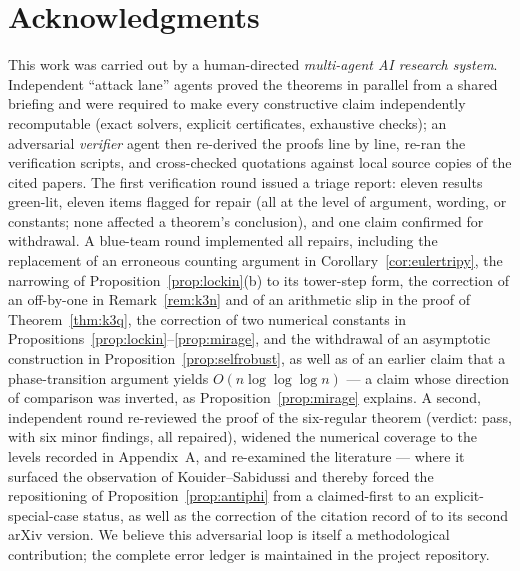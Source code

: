 \documentclass[a4paper,11pt]{amsart}
\theoremstyle{definition}
\theoremstyle{remark}
\begin{document}
\section*{Acknowledgments}

This work was carried out by a human-directed \emph{multi-agent AI research system}. Independent
``attack lane'' agents proved the theorems in parallel from a shared briefing and were required to make
every constructive claim independently recomputable (exact solvers, explicit certificates, exhaustive
checks); an adversarial \emph{verifier} agent then re-derived the proofs line by line, re-ran the
verification scripts, and cross-checked quotations against local source copies of the cited papers. The
first verification round issued a triage report: eleven results green-lit, eleven items flagged for repair
(all at the level of argument, wording, or constants; none affected a theorem's conclusion), and one claim
confirmed for withdrawal. A blue-team round implemented all repairs, including the replacement of an
erroneous counting argument in Corollary~\ref{cor:eulertripy}, the narrowing of
Proposition~\ref{prop:lockin}(b) to its tower-step form, the correction of an off-by-one in
Remark~\ref{rem:k3n} and of an arithmetic slip in the proof of Theorem~\ref{thm:k3q}, the correction of
two numerical constants in Propositions~\ref{prop:lockin}--\ref{prop:mirage}, and the withdrawal of an
asymptotic construction in Proposition~\ref{prop:selfrobust}, as well as of an earlier claim that a
phase-transition argument yields $O(n\log\log\log n)$ --- a claim whose direction of comparison was
inverted, as Proposition~\ref{prop:mirage} explains. A second, independent round re-reviewed the proof of
the six-regular theorem (verdict: pass, with six minor findings, all repaired), widened the numerical
coverage to the levels recorded in Appendix~A, and re-examined the literature --- where it surfaced the
observation of Kouider--Sabidussi \cite{KS95} and thereby forced the repositioning of
Proposition~\ref{prop:antiphi} from a claimed-first to an explicit-special-case status, as well as the
correction of the citation record of \cite{AABC25} to its second arXiv version. We believe this
adversarial loop is itself a methodological contribution; the complete error ledger is maintained in the
project repository.
\end{document}
